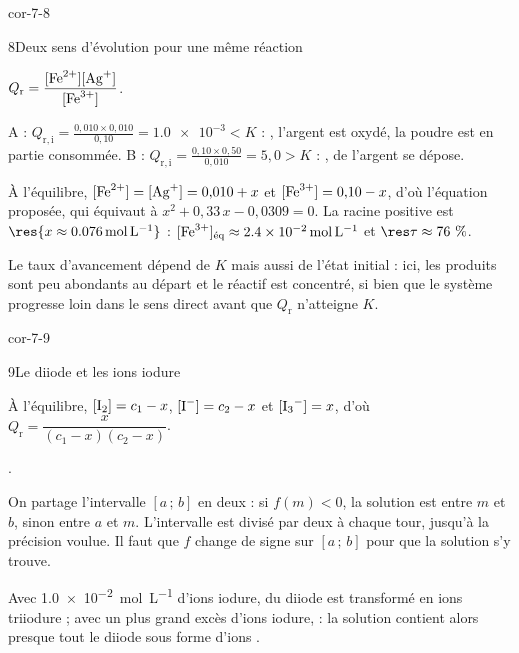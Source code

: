 \begin{blocLivre}{cor-7-8}
\begin{corrige}{8}{Deux sens d'évolution pour une même réaction}
\begin{questions}
\item $Q_\mathrm{r}=\dfrac{[\ce{Fe^2+}][\ce{Ag+}]}{[\ce{Fe^3+}]}$.
\item A : $Q_{\mathrm{r},\mathrm{i}}=\frac{0{,}010\times0{,}010}{0{,}10}=\num{1.0e-3}<K$ : , l'argent est
oxydé, la poudre est en partie consommée. B : $Q_{\mathrm{r},\mathrm{i}}=\frac{0{,}10\times0{,}50}{0{,}010}=5{,}0>K$ :
, de l'argent se dépose.
\item À l'équilibre, $[\ce{Fe^2+}]=[\ce{Ag+}]=0{,}010+x$ et $[\ce{Fe^3+}]=0{,}10-x$, d'où l'équation proposée, qui équivaut à
$x^2+0{,}33\,x-0{,}0309=0$. La racine positive est $\res{x\approx\qty{0,076}{mol.L^{-1}}}$ : $[\ce{Fe^3+}]_\text{éq}\approx\qty{2,4e-2}{mol.L^{-1}}$
et $\res{\tau\approx76~\%}$.
\item Le taux d'avancement dépend de $K$ mais aussi de l'état initial : ici, les produits sont peu abondants au départ et
le réactif  est concentré, si bien que le système progresse loin dans le sens direct avant que $Q_\mathrm{r}$
n'atteigne $K$.
\end{questions}
\end{corrige}
\end{blocLivre}
\begin{blocLivre}{cor-7-9}
\begin{corrige}{9}{Le diiode et les ions iodure}
\begin{questions}
\item À l'équilibre, $[\ce{I2}]=c_1-x$, $[\ce{I-}]=c_2-x$ et $[\ce{I3-}]=x$, d'où $Q_\mathrm{r}=\dfrac{x}{(c_1-x)(c_2-x)}$.
\item {}.
\item On partage l'intervalle $[a\,;\,b]$ en deux : si $f(m)<0$, la solution est entre $m$ et $b$, sinon entre $a$ et $m$.
L'intervalle est divisé par deux à chaque tour, jusqu'à la précision voulue. Il faut que $f$ change de signe sur
$[a\,;\,b]$ pour que la solution s'y trouve.
\item Avec \qty{1,0e-2}{mol.L^{-1}} d'ions iodure,  du diiode est transformé en ions triiodure ; avec un plus
grand excès d'ions iodure,  : la solution contient alors presque tout le diiode sous forme d'ions .
\end{questions}
\end{corrige}
\end{blocLivre}

